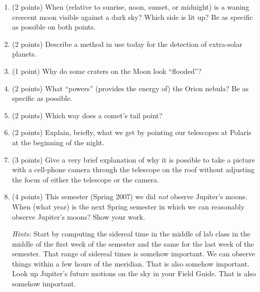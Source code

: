 \documentclass[12pt]{article}
\begin{document}
\begin{enumerate}
\vspace{1in}

\item (2 points)
When (relative to sunrise, noon, sunset, or midnight) is a waning
crescent moon visible against a dark sky?  Which side is lit up?  Be
as specific as possible on both points.

\vspace{0.5in}

\item (2 points)
Describe a method in use today for the detection of extra-solar
planets.

\vspace{1in}

\item (1 point)
Why do some craters on the Moon look ``flooded''?

\vspace{1in}

\item (2 points)
What ``powers'' (provides the energy of) the Orion nebula?  Be as
specific as possible.

\vspace{1in}

\item (2 points)
Which way does a comet's tail point?

\vspace{1in}

\item (2 points)
Explain, briefly, what we get by pointing our telescopes at Polaris at
the beginning of the night.

\vspace{1in}

\item (3 points)
Give a very brief explanation of why it is possible to take a picture
with a cell-phone camera through the telescope on the roof without
adjusting the focus of either the telescope or the camera.

\vspace{1in}

\clearpage
\item (4 points)
This semester (Spring 2007) we did \emph{not} observe Jupiter's moons.
When (what year) is the next Spring semester in which we can
reasonably observe Jupiter's moons?  Show your work.

\emph{Hints:} Start by computing the sidereal time in the middle of
lab class in the middle of the first week of the semester and the same
for the last week of the semester.  That range of sidereal times is
somehow important.  We can observe things within a few hours of the
meridian.  That is also somehow important.  Look up Jupiter's future
motions on the sky in your Field Guide.  That is also somehow
important.

\vspace{2in}

\end{enumerate}
\end{document}
